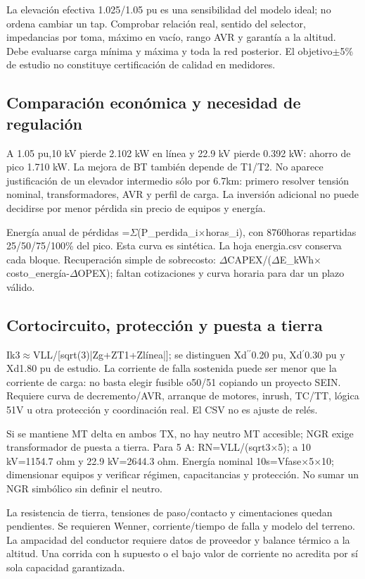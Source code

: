 La elevación efectiva 1.025/1.05 pu es una sensibilidad del modelo ideal; no ordena cambiar un tap. Comprobar relación real, sentido del selector, impedancias por toma, máximo en vacío, rango AVR y garantía a la altitud. Debe evaluarse carga mínima y máxima y toda la red posterior. El objetivo\ensuremath{\pm}5\% de estudio no constituye certificación de calidad en medidores.

\setcounter{subsection}{3}
\subsection{Comparación económica y necesidad de regulación}
A 1.05 pu,10 kV pierde 2.102 kW en línea y 22.9 kV pierde 0.392 kW: ahorro de pico 1.710 kW. La mejora de BT también depende de T1/T2. No aparece justificación de un elevador intermedio sólo por 6.7km: primero resolver tensión nominal, transformadores, AVR y perfil de carga. La inversión adicional no puede decidirse por menor pérdida sin precio de equipos y energía.

Energía anual de pérdidas =\ensuremath{\Sigma}(P\_\allowbreak{}perdida\_\allowbreak{}i\ensuremath{\times}horas\_\allowbreak{}i), con 8760horas repartidas 25/50/75/100\% del pico. Esta curva es sintética. La hoja energia.csv conserva cada bloque. Recuperación simple de sobrecosto: \ensuremath{\Delta}CAPEX/(\ensuremath{\Delta}E\_\allowbreak{}kWh\ensuremath{\times}costo\_\allowbreak{}energía-\ensuremath{\Delta}OPEX); faltan cotizaciones y curva horaria para dar un plazo válido.

\setcounter{subsection}{4}
\subsection{Cortocircuito, protección y puesta a tierra}
Ik3\ensuremath{\approx}VLL/[sqrt(3)|Zg+ZT1+Zlínea|]; se distinguen Xd\ensuremath{^{\prime\prime}}0.20 pu, Xd\ensuremath{^{\prime}}0.30 pu y Xd1.80 pu de estudio. La corriente de falla sostenida puede ser menor que la corriente de carga: no basta elegir fusible o50/51 copiando un proyecto SEIN. Requiere curva de decremento/AVR, arranque de motores, inrush, TC/TT, lógica 51V u otra protección y coordinación real. El CSV no es ajuste de relés.

Si se mantiene MT delta en ambos TX, no hay neutro MT accesible; NGR exige transformador de puesta a tierra. Para 5 A: RN=VLL/(sqrt3\ensuremath{\times}5); a 10 kV=1154.7 ohm y 22.9 kV=2644.3 ohm. Energía nominal 10s=Vfase\ensuremath{\times}5\ensuremath{\times}10; dimensionar equipos y verificar régimen, capacitancias y protección. No sumar un NGR simbólico sin definir el neutro.

La resistencia de tierra, tensiones de paso/contacto y cimentaciones quedan pendientes. Se requieren Wenner, corriente/tiempo de falla y modelo del terreno. La ampacidad del conductor requiere datos de proveedor y balance térmico a la altitud. Una corrida con h supuesto o el bajo valor de corriente no acredita por sí sola capacidad garantizada.

